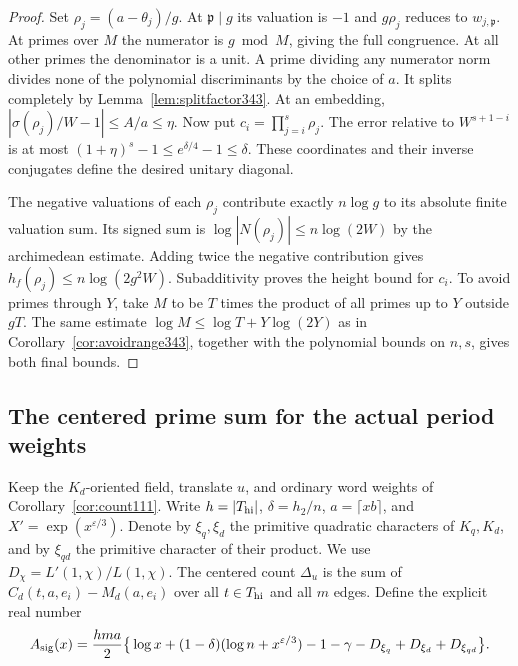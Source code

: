 \documentclass[a4paper,11pt]{article}
\theoremstyle{definition}
\theoremstyle{remark}
\numberwithin{equation}{section}
\begin{document}
\begin{proof}
Set $\rho_j=(a-\theta_j)/g$. At $\mathfrak p\mid g$ its valuation
is $-1$ and $g\rho_j$ reduces to $w_{j,\mathfrak p}$. At primes
over $M$ the numerator is $g\bmod M$, giving the full congruence.
At all other primes the denominator is a unit. A prime dividing
any numerator norm divides none of the polynomial discriminants
by the choice of $a$. It splits completely by
Lemma~\ref{lem:splitfactor343}. At an embedding,
$|\sigma(\rho_j)/W-1|\le A/a\le\eta$. Now put
$c_i=\prod_{j=i}^s\rho_j$. The error relative to $W^{s+1-i}$ is
at most $(1+\eta)^s-1\le e^{\delta/4}-1\le\delta$.
These coordinates and their inverse conjugates define the desired
unitary diagonal.

The negative valuations of each $\rho_j$ contribute exactly
$n\log g$ to its absolute finite valuation sum. Its signed sum
is $\log|N(\rho_j)|\le n\log(2W)$ by the archimedean estimate.
Adding twice the negative contribution gives
$h_f(\rho_j)\le n\log(2g^2W)$. Subadditivity proves the height
bound for $c_i$. To avoid primes through $Y$, take $M$ to be $T$
times the product of all primes up to $Y$ outside $gT$. The same
estimate $\log M\le\log T+Y\log(2Y)$ as in
Corollary~\ref{cor:avoidrange343}, together with the polynomial
bounds on $n,s$, gives both final bounds.
\end{proof}



\subsection{The centered prime sum for the actual period weights}
\label{sec:centeredwordperiods451}

Keep the \(K_d\)-oriented field, translate \(u\), and ordinary
word weights of Corollary~\ref{cor:count111}. Write
\(h=|T_{\rm hi}|\), \(\delta=h_2/n\), \(a=\lceil xb\rceil\),
and \(X'=\exp(x^{\varepsilon/3})\). Denote by \(\xi_q,\xi_d\)
the primitive quadratic characters of \(K_q,K_d\), and by
\(\xi_{qd}\) the primitive character of their product. We use
\(D_\chi=L'(1,\chi)/L(1,\chi)\). The centered count
\(\Delta_u\) is the sum of \(C_d(t,a,e_i)-M_d(a,e_i)\)
over all \(t\in T_{\rm hi}\) and all \(m\) edges.
Define the explicit real number
\[
 A_{\rm sig}(x)=\frac{hma}{2}
 \big\{\log x+(1-\delta)(\log n+x^{\varepsilon/3})
     -1-\gamma-D_{\xi_q}+D_{\xi_d}+D_{\xi_{qd}}\big\}.
\]
\end{document}
